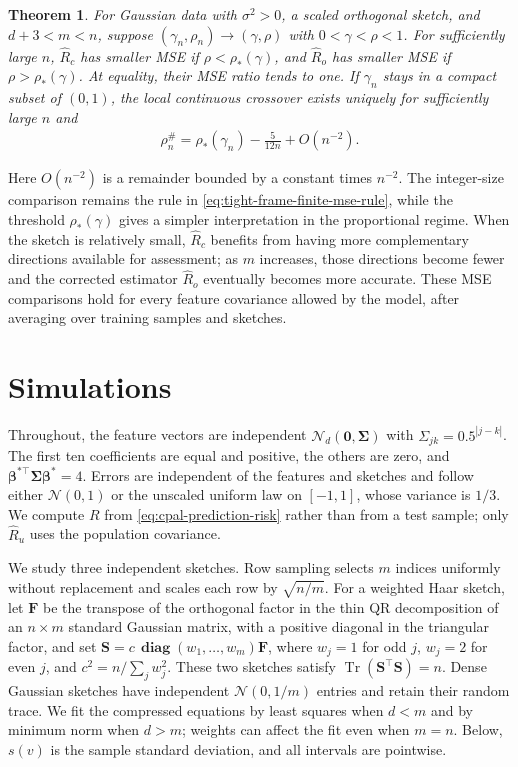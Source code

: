 \documentclass{article}
\theoremstyle{plain}
\newtheorem{theorem}{Theorem}[section]
\theoremstyle{definition}
\theoremstyle{definition}
\newcommand{\boldzero}{\mathbf{0}}
\DeclareMathOperator{\trace}{Tr}
\DeclareMathOperator{\diag}{\mathbf{diag}}
\def\mathbold{\boldsymbol}
\def\cal{\mathcal}
\def\bF{\mathbold{F}}\def\calF{{\cal F}}\def\scrF{{\mathscr F}}\def\Fhat{\widehat{F}}\def\Ftil{{\widetilde F}}
\def\calN{{\cal N}}\def\scrN{{\mathscr N}}\def\Nhat{\widehat{N}}\def\Ntil{{\widetilde N}}\def\Nbar{{\overline N}}
\def\bS{\mathbold{S}}\def\hbS{{\widehat{\bS}}}\def\tbS{{\widetilde{\bS}}}
\def\bbeta{\mathbold{\beta}}\def\betahat{\widehat{\beta}}\def\hbeta{\widehat{\beta}}
\def\bSigma{\mathbold{\Sigma}}\def\hbSigma{{\widehat{\bSigma}}}
\newcommand{\hR}{\hat{R}}
\begin{document}
\begin{theorem}
\label{thm:cpal-mse-comparison}
\label{thm:tight-frame-asymptotic-mse-threshold}
For Gaussian data with $\sigma^2>0$, a scaled orthogonal sketch, and
$d+3<m<n$, suppose $(\gamma_n,\rho_n)\to(\gamma,\rho)$ with
$0<\gamma<\rho<1$.
For sufficiently large $n$, $\widehat R_c$ has smaller MSE if
$\rho<\rho_*(\gamma)$, and $\hR_o$ has smaller MSE if
$\rho>\rho_*(\gamma)$. At equality, their MSE ratio tends to one.
If $\gamma_n$ stays in a compact subset of $(0,1)$, the local
continuous crossover exists uniquely for sufficiently large $n$ and
\begin{align}
 \rho_n^{\#}
 =\rho_*(\gamma_n)-\frac{5}{12n}+O(n^{-2}).
 \label{eq:cpal-finite-mse-threshold}
\end{align}
\end{theorem}

Here $O(n^{-2})$ is a remainder bounded by a constant times $n^{-2}$. The integer-size comparison remains the rule in \eqref{eq:tight-frame-finite-mse-rule}, while the threshold $\rho_*(\gamma)$ gives a simpler interpretation in the proportional regime. When the sketch is relatively small, $\widehat R_c$ benefits from having more complementary directions available for assessment; as $m$ increases, those directions become fewer and the corrected estimator $\hR_o$ eventually becomes more accurate. These MSE comparisons hold for every feature covariance allowed by the model, after averaging over training samples and sketches.


\section{Simulations}
\label{sec:simulations}

Throughout, the feature vectors are independent
$\calN_d(\boldzero,\bSigma)$ with $\Sigma_{jk}=0.5^{|j-k|}$. The first
ten coefficients are equal and positive, the others are zero, and
$\bbeta^{*\top}\bSigma\bbeta^*=4$. Errors are independent of the features
and sketches and follow either $\calN(0,1)$ or the unscaled uniform law on
$[-1,1]$, whose variance is $1/3$. We compute $R$ from
\eqref{eq:cpal-prediction-risk} rather than from a test sample; only
$\hR_u$ uses the population covariance.

We study three independent sketches. Row sampling selects $m$ indices
uniformly without replacement and scales each row by $\sqrt{n/m}$. For a
weighted Haar sketch, let $\bF$ be the transpose of the orthogonal factor
in the thin QR decomposition of an $n\times m$ standard Gaussian matrix,
with a positive diagonal in the triangular factor, and set
$\bS=c\,\diag(w_1,\ldots,w_m)\bF$, where $w_j=1$ for odd $j$, $w_j=2$
for even $j$, and $c^2=n/\sum_jw_j^2$. These two sketches satisfy
$\trace(\bS^\top\bS)=n$. Dense Gaussian sketches have independent
$\calN(0,1/m)$ entries and retain their random trace. We fit the compressed
equations by least squares when $d<m$ and by minimum norm when $d>m$;
weights can affect the fit even when $m=n$. Below, $s(v)$ is the sample
standard deviation, and all intervals are pointwise.
\end{document}
